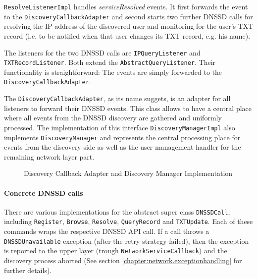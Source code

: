 \texttt{ResolveListenerImpl} handles \emph{serviceResolved} events. It first forwards the event to the \texttt{DiscoveryCallbackAdapter} and second starts two further DNSSD calls for resolving the IP address of the discovered user and monitoring for the user's TXT record (i.e. to be notified when that user changes its TXT record, e.g. his name).

The listeners for the two DNSSD calls are \texttt{IPQueryListener} and \texttt{TXTRecordListener}. Both extend the \texttt{AbstractQueryListener}. Their functionality is straightforward: The events are simply forwarded to the \texttt{DiscoveryCallbackAdapter}.

The \texttt{DiscoveryCallbackAdapter}, as its name suggets, is an adapter for all listeners to forward their DNSSD events. This class allows to have a central place where all events from the DNSSD discovery are gathered and uniformly processed. The implementation of this interface \texttt{DiscoveryManagerImpl} also implements \texttt{DiscoveryManager} and represents the central processing place for events from the discovery side as well as the user management handler for the remaining network layer part.

\begin{figure}[H]
 \centering
 \caption{Discovery Callback Adapter and Discovery Manager Implementation}
 \label{fig:network.discovery.managerandadapter}
\end{figure}


\paragraph{Concrete DNSSD calls}
\label{chapter:network.discovery.dnssdcalls}
There are various implementations for the abstract super class \texttt{DNSSDCall}, including \texttt{Register}, \texttt{Browse}, \texttt{Resolve}, \texttt{QueryRecord} and \texttt{TXTUpdate}. Each of these commands wraps the respective DNSSD API call. If a call throws a \texttt{DNSSDUnavailable} exception (after the retry strategy failed), then the exception is reported to the upper layer (trough \texttt{NetworkServiceCallback}) and the discovery process aborted (See section \ref{chapter:network.exceptionhandling} for further details).

